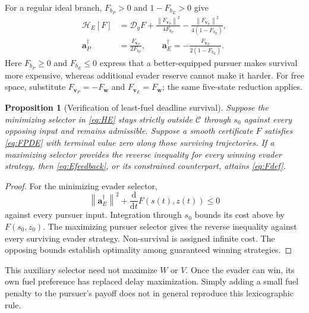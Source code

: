 \documentclass[journal,a4paper]{IEEEtran}
\newtheorem{proposition}{Proposition}
\newcommand{\C}{\mathcal C}
\newcommand{\D}{\mathcal D}
\newcommand{\HH}{\mathcal H}
\newcommand{\norm}[1]{\left\|#1\right\|}
\newcommand{\dd}{\mathrm d}
\begin{document}
For a regular ideal branch, $F_{b_P}>0$ and $1-F_{b_E}>0$ give
\begin{align}
 \HH_E[F]&=\D_g F
  +\frac{\norm{F_{\mathbf v_P}}^2}{4F_{b_P}}
  -\frac{\norm{F_{\mathbf v_E}}^2}{4(1-F_{b_E})},\label{eq:HEquad}\\
 \mathbf a_P^{\dagger}&=\frac{F_{\mathbf v_P}}{2F_{b_P}},\qquad
 \mathbf a_E^{\dagger}=-\frac{F_{\mathbf v_E}}{2(1-F_{b_E})}.
 \label{eq:Efeedback}
\end{align}
Here $F_{b_P}\ge0$ and $F_{b_E}\le0$ express that a better-equipped pursuer makes survival more expensive, whereas additional evader reserve cannot make it harder. For free space, substitute $F_{\mathbf v_P}=-F_{\mathbf w}$ and $F_{\mathbf v_E}=F_{\mathbf w}$; the same five-state reduction applies.

\begin{proposition}[Verification of least-fuel deadline survival]
Suppose the minimizing selector in \eqref{eq:HE} stays strictly outside $\C$ through $s_0$ against every opposing input and remains admissible. Suppose a smooth certificate $F$ satisfies \eqref{eq:FPDE} with terminal value zero along those surviving trajectories. If a maximizing selector provides the reverse inequality for every winning evader strategy, then \eqref{eq:Efeedback}, or its constrained counterpart, attains \eqref{eq:Fdef}.
\end{proposition}
\begin{proof}
For the minimizing evader selector,
\begin{equation}
 \norm{\mathbf a_E^{\dagger}}^2+\frac{\dd}{\dd t}F(s(t),z(t))\le0
\end{equation}
against every pursuer input. Integration through $s_0$ bounds its cost above by $F(s_0,z_0)$. The maximizing pursuer selector gives the reverse inequality against every surviving evader strategy. Non-survival is assigned infinite cost. The opposing bounds establish optimality among guaranteed winning strategies.
\end{proof}

This auxiliary selector need not maximize $W$ or $V$. Once the evader can win, its own fuel preference has replaced delay maximization. Simply adding a small fuel penalty to the pursuer's payoff does not in general reproduce this lexicographic rule.
\end{document}
